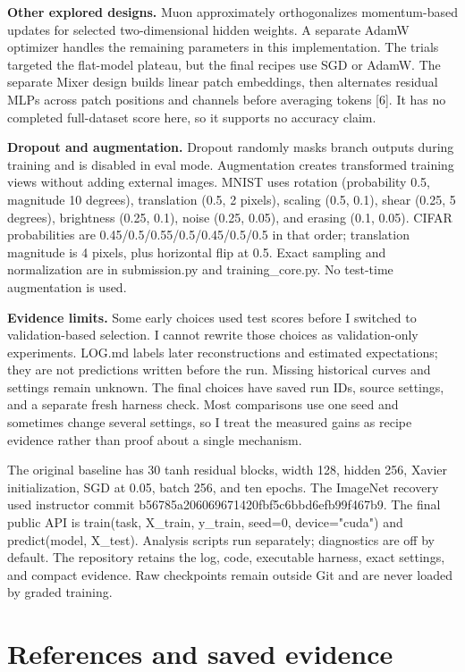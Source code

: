 \documentclass[journal,10pt,letterpaper]{IEEEtran}
\begin{document}
\textbf{Other explored designs.} Muon approximately orthogonalizes momentum-based updates for selected two-dimensional hidden weights. A separate AdamW optimizer handles the remaining parameters in this implementation. The trials targeted the flat-model plateau, but the final recipes use SGD or AdamW. The separate Mixer design builds linear patch embeddings, then alternates residual MLPs across patch positions and channels before averaging tokens [6]. It has no completed full-dataset score here, so it supports no accuracy claim.

\textbf{Dropout and augmentation.} Dropout randomly masks branch outputs during training and is disabled in eval mode. Augmentation creates transformed training views without adding external images. MNIST uses rotation (probability 0.5, magnitude 10 degrees), translation (0.5, 2 pixels), scaling (0.5, 0.1), shear (0.25, 5 degrees), brightness (0.25, 0.1), noise (0.25, 0.05), and erasing (0.1, 0.05). CIFAR probabilities are 0.45/0.5/0.55/0.5/0.45/0.5/0.5 in that order; translation magnitude is 4 pixels, plus horizontal flip at 0.5. Exact sampling and normalization are in submission.py and training\_core.py. No test-time augmentation is used.

\textbf{Evidence limits.} Some early choices used test scores before I switched to validation-based selection. I cannot rewrite those choices as validation-only experiments. LOG.md labels later reconstructions and estimated expectations; they are not predictions written before the run. Missing historical curves and settings remain unknown. The final choices have saved run IDs, source settings, and a separate fresh harness check. Most comparisons use one seed and sometimes change several settings, so I treat the measured gains as recipe evidence rather than proof about a single mechanism.

The original baseline has 30 tanh residual blocks, width 128, hidden 256, Xavier initialization, SGD at 0.05, batch 256, and ten epochs. The ImageNet recovery used instructor commit b56785a206069671420fbf5c6bbd6efb99f467b9. The final public API is train(task, X\_train, y\_train, seed=0, device="cuda") and predict(model, X\_test). Analysis scripts run separately; diagnostics are off by default. The repository retains the log, code, executable harness, exact settings, and compact evidence. Raw checkpoints remain outside Git and are never loaded by graded training.

\section*{References and saved evidence}
\end{document}
